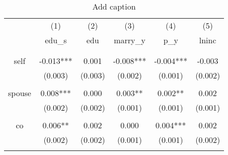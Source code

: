 \documentclass{article}
\begin{document}
\begin{table}[htbp]
    \centering
    \caption{Add caption}
      \begin{tabular}{lllrrr}
      \hline
      \multicolumn{1}{c}{} & \multicolumn{1}{c}{(1)} & \multicolumn{1}{c}{(2)} & \multicolumn{1}{c}{(3)} & \multicolumn{1}{c}{(4)} & \multicolumn{1}{c}{(5)} \bigstrut[t]\\
      \multicolumn{1}{c}{} & \multicolumn{1}{c}{edu\_s} & \multicolumn{1}{c}{edu} & \multicolumn{1}{c}{marry\_y} & \multicolumn{1}{c}{p\_y} & \multicolumn{1}{c}{lninc} \\
                 &            &            &            &            &  \bigstrut[b]\\
      \hline
                 & \multicolumn{1}{c}{} & \multicolumn{1}{c}{} & \multicolumn{1}{c}{} & \multicolumn{1}{c}{} & \multicolumn{1}{c}{} \bigstrut[t]\\
      \multicolumn{1}{c}{self} & \multicolumn{1}{c}{-0.013***} & \multicolumn{1}{c}{0.001} & \multicolumn{1}{c}{-0.008***} & \multicolumn{1}{c}{-0.004***} & \multicolumn{1}{c}{-0.003} \\
      \multicolumn{1}{c}{} & \multicolumn{1}{c}{(0.003)} & \multicolumn{1}{c}{(0.003)} & \multicolumn{1}{c}{(0.002)} & \multicolumn{1}{c}{(0.001)} & \multicolumn{1}{c}{(0.002)} \\
                 &            &            &            &            &  \\
      \multicolumn{1}{c}{spouse} & \multicolumn{1}{c}{0.008***} & \multicolumn{1}{c}{0.000} & \multicolumn{1}{c}{0.003**} & \multicolumn{1}{c}{0.002**} & \multicolumn{1}{c}{0.002} \\
      \multicolumn{1}{c}{} & \multicolumn{1}{c}{(0.002)} & \multicolumn{1}{c}{(0.002)} & \multicolumn{1}{c}{(0.001)} & \multicolumn{1}{c}{(0.001)} & \multicolumn{1}{c}{(0.001)} \\
                 &            &            &            &            &  \\
      \multicolumn{1}{c}{co} & \multicolumn{1}{c}{0.006**} & \multicolumn{1}{c}{0.002} & \multicolumn{1}{c}{0.000} & \multicolumn{1}{c}{0.004***} & \multicolumn{1}{c}{0.002} \\
      \multicolumn{1}{c}{} & \multicolumn{1}{c}{(0.002)} & \multicolumn{1}{c}{(0.002)} & \multicolumn{1}{c}{(0.001)} & \multicolumn{1}{c}{(0.001)} & \multicolumn{1}{c}{(0.002)} \\
                 &            &            &            &            &  \\

\end{tabular}
\end{table}
\end{document}
